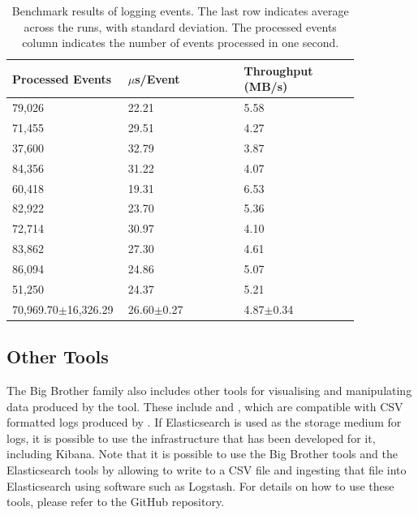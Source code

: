 \begin{table}
\centering
\begin{tabular}{p{0.28\linewidth}p{0.28\linewidth}p{0.29\linewidth}}
	\hline
	Processed Events    & $\mu$s/Event   & Throughput (MB/s) \\ \hline
	79,026     & 22.21          & 5.58              \\
	71,455     & 29.51          & 4.27              \\
	37,600     & 32.79          & 3.87              \\
	84,356     & 31.22          & 4.07              \\
	60,418     & 19.31          & 6.53              \\
	82,922     & 23.70          & 5.36              \\
	72,714     & 30.97          & 4.10              \\
	83,862     & 27.30          & 4.61              \\
	86,094     & 24.86          & 5.07              \\
	51,250     & 24.37          & 5.21              \\ \hline\hline
	70,969.70$\pm$16,326.29 & 26.60$\pm$0.27 & 4.87$\pm$0.34     \\ \hline
\end{tabular}
\caption{Benchmark results of logging events. The last row indicates average across the runs, with standard deviation. The processed events column indicates the number of events processed in one second.\vspace{-24pt}}
\label{tbl:bench}
\end{table}



\subsection{Other Tools}

The Big Brother family also includes other tools for visualising and manipulating data produced by the \bb tool. These include \bbheat and \bbstat, which are compatible with CSV formatted logs produced by \bb. If Elasticsearch is used as the storage medium for logs, it is possible to use the infrastructure that has been developed for it, including Kibana. Note that it is possible to use the Big Brother tools and the Elasticsearch tools by allowing \bb to write to a CSV file and ingesting that file into Elasticsearch using software such as Logstash. For details on how to use these tools, please refer to the GitHub repository.

